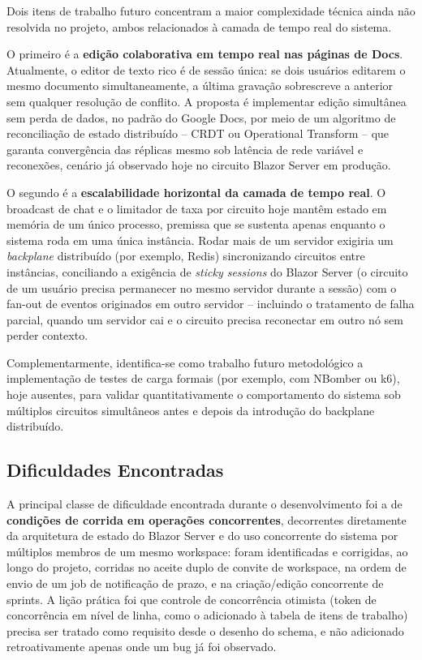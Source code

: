 \documentclass[12pt]{article}
\begin{document}
Dois itens de trabalho futuro concentram a maior complexidade técnica ainda não resolvida no projeto, ambos relacionados à camada de tempo real do sistema.

O primeiro é a \textbf{edição colaborativa em tempo real nas páginas de Docs}. Atualmente, o editor de texto rico é de sessão única: se dois usuários editarem o mesmo documento simultaneamente, a última gravação sobrescreve a anterior sem qualquer resolução de conflito. A proposta é implementar edição simultânea sem perda de dados, no padrão do Google Docs, por meio de um algoritmo de reconciliação de estado distribuído -- CRDT \cite{shapiro2011crdt} ou Operational Transform \cite{ellis1989concurrency} -- que garanta convergência das réplicas mesmo sob latência de rede variável e reconexões, cenário já observado hoje no circuito Blazor Server em produção.

O segundo é a \textbf{escalabilidade horizontal da camada de tempo real}. O broadcast de chat e o limitador de taxa por circuito hoje mantêm estado em memória de um único processo, premissa que se sustenta apenas enquanto o sistema roda em uma única instância. Rodar mais de um servidor exigiria um \emph{backplane} distribuído (por exemplo, Redis) sincronizando circuitos entre instâncias, conciliando a exigência de \emph{sticky sessions} do Blazor Server (o circuito de um usuário precisa permanecer no mesmo servidor durante a sessão) com o fan-out de eventos originados em outro servidor -- incluindo o tratamento de falha parcial, quando um servidor cai e o circuito precisa reconectar em outro nó sem perder contexto.

Complementarmente, identifica-se como trabalho futuro metodológico a implementação de testes de carga formais (por exemplo, com NBomber ou k6), hoje ausentes, para validar quantitativamente o comportamento do sistema sob múltiplos circuitos simultâneos antes e depois da introdução do backplane distribuído.

\subsection{Dificuldades Encontradas}
\label{sec:dificuldades}

A principal classe de dificuldade encontrada durante o desenvolvimento foi a de \textbf{condições de corrida em operações concorrentes}, decorrentes diretamente da arquitetura de estado do Blazor Server e do uso concorrente do sistema por múltiplos membros de um mesmo workspace: foram identificadas e corrigidas, ao longo do projeto, corridas no aceite duplo de convite de workspace, na ordem de envio de um job de notificação de prazo, e na criação/edição concorrente de sprints. A lição prática foi que controle de concorrência otimista (token de concorrência em nível de linha, como o adicionado à tabela de itens de trabalho) precisa ser tratado como requisito desde o desenho do schema, e não adicionado retroativamente apenas onde um bug já foi observado.
\end{document}
